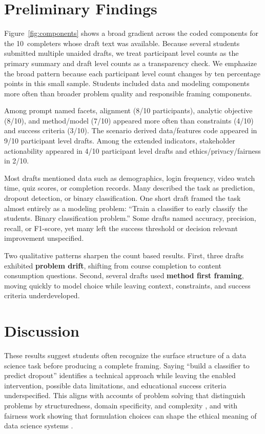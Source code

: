 \documentclass[sigconf,screen,anonymous]{acmart}
\begin{document}
\section{Preliminary Findings}
Figure~\ref{fig:components} shows a broad gradient across the coded components for the 10~completers whose draft text was available. Because several students submitted multiple unaided drafts, we treat participant level counts as the primary summary and draft level counts as a transparency check. We emphasize the broad pattern because each participant level count changes by ten percentage points in this small sample. Students included data and modeling components more often than broader problem quality and responsible framing components.

Among prompt named facets, alignment (8/10 participants), analytic objective (8/10), and method/model (7/10) appeared more often than constraints (4/10) and success criteria (3/10). The scenario derived data/features code appeared in 9/10 participant level drafts. Among the extended indicators, stakeholder actionability appeared in 4/10 participant level drafts and ethics/privacy/fairness in 2/10.

Most drafts mentioned data such as demographics, login frequency, video watch time, quiz scores, or completion records. Many described the task as prediction, dropout detection, or binary classification. One short draft framed the task almost entirely as a modeling problem: ``Train a classifier to early classify the students. Binary classification problem.'' Some drafts named accuracy, precision, recall, or F1-score, yet many left the success threshold or decision relevant improvement unspecified.

Two qualitative patterns sharpen the count based results. First, three drafts exhibited \textbf{problem drift}, shifting from course completion to content consumption questions. Second, several drafts used \textbf{method first framing}, moving quickly to model choice while leaving context, constraints, and success criteria underdeveloped.

\section{Discussion}
These results suggest students often recognize the surface structure of a data science task before producing a complete framing. Saying ``build a classifier to predict dropout'' identifies a technical approach while leaving the enabled intervention, possible data limitations, and educational success criteria underspecified. This aligns with accounts of problem solving that distinguish problems by structuredness, domain specificity, and complexity \cite{jonassen2000design}, and with fairness work showing that formulation choices can shape the ethical meaning of data science systems \cite{passi2019problem}.
\end{document}
